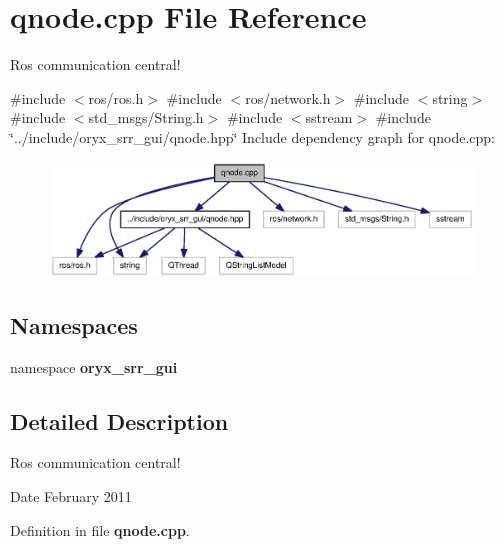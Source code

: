 \section{qnode.\-cpp \-File \-Reference}
\label{qnode_8cpp}


\-Ros communication central!  


{\ttfamily \#include $<$ros/ros.\-h$>$}\*
{\ttfamily \#include $<$ros/network.\-h$>$}\*
{\ttfamily \#include $<$string$>$}\*
{\ttfamily \#include $<$std\-\_\-msgs/\-String.\-h$>$}\*
{\ttfamily \#include $<$sstream$>$}\*
{\ttfamily \#include \char`\"{}../include/oryx\-\_\-srr\-\_\-gui/qnode.\-hpp\char`\"{}}\*
\-Include dependency graph for qnode.\-cpp\-:
\nopagebreak
\begin{figure}[H]
\begin{center}
\leavevmode
\includegraphics[width=350pt]{qnode_8cpp__incl}
\end{center}
\end{figure}
\subsection*{\-Namespaces}
\begin{DoxyCompactItemize}
\item 
namespace {\bf oryx\-\_\-srr\-\_\-gui}
\end{DoxyCompactItemize}


\subsection{\-Detailed \-Description}
\-Ros communication central! \begin{DoxyDate}{\-Date}
\-February 2011 
\end{DoxyDate}


\-Definition in file {\bf qnode.\-cpp}.

